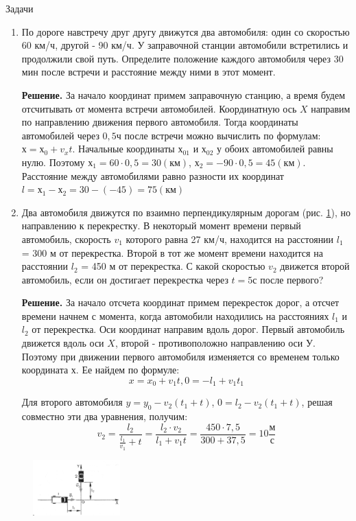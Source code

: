 \documentclass[a6paper, 11pt]{diss_4}
\renewcommand{\'}{\,'}
\begin{document}
\begin{center}
   Задачи
\end{center}
\begin{enumerate}
\item{ По дороге навстречу друг другу движутся два автомобиля: один со скоростью
60 км/ч, другой - 90 км/ч. У заправочной станции автомобили встретились и
продолжили свой путь. Определите положение каждого автомобиля через 30 мин
после встречи и расстояние между ними в этот момент.

 \textbf{Решение.} За начало координат примем заправочную станцию, а время будем
отсчитывать от момента встречи автомобилей. Координатную ось $X$ направим по
направлению движения первого автомобиля. Тогда координаты автомобилей через
$0,5 ч$ после встречи можно вычислить по формулам: $х = х_0 + v_xt$.
Начальные координаты $х_{01}$ и $х_{02}$ у обоих автомобилей равны нулю.
Поэтому $х_1 = 60\cdot 0,5 = 30 (км)$, $х_2 = -90\cdot0,5 = 45 (км)$.
Расстояние между автомобилями равно разности их координат
$l = х_1 - х_2 = 30-(-45) = 75 (км)$
}

 \item{ Два автомобиля движутся по взаимно перпендикулярным дорогам (рис. \ref{fig9}), но
направлению к перекрестку. В некоторый момент времени первый автомобиль,
скорость $v_1$ которого равна 27 км/ч, находится на расстоянии $l_1$ = 300 м
от перекрестка. Второй в тот же момент времени находится на расстоянии $l_2$
= 450 м от перекрестка. С какой скоростью $v_2$ движется второй автомобиль,
если он достигает перекрестка через $t= 5с$ после первого?

\textbf{Решение.} За начало отсчета координат примем перекресток дорог, а отсчет
времени начнем с момента, когда автомобили находились на расстояниях $l_1$ и $l_2$ от
перекрестка. Оси координат направим вдоль дорог. Первый автомобиль движется
вдоль оси $X$, второй - противоположно направлению оси $У$. Поэтому при движении
первого автомобиля изменяется со временем только координата $х$. Ее найдем по
формуле: \[x=x_0+v_1t, 0=-l_1+v_1t_1\]

  Для второго автомобиля $y = y_0 - v_2(t_1 + t)$, $0 = l_2 - v_2(t_1 + t)$,
решая совместно эти два уравнения, получим:
\[
v_2=\frac{l_2}{\frac{l_1}{v_1}+t}=
\frac{l_2\cdot v_2}{l_1+v_1t}=
\frac{450\cdot 7,5}{300+37,5}
=10 \frac{м}{с}
\]
}
\end{enumerate}

\begin{figure}
\begin{center}
\includegraphics[width=0.3\textwidth]{img/img_09.eps}
\caption{}
\end{center}
\label{fig9}
\end{figure}
\end{document}
